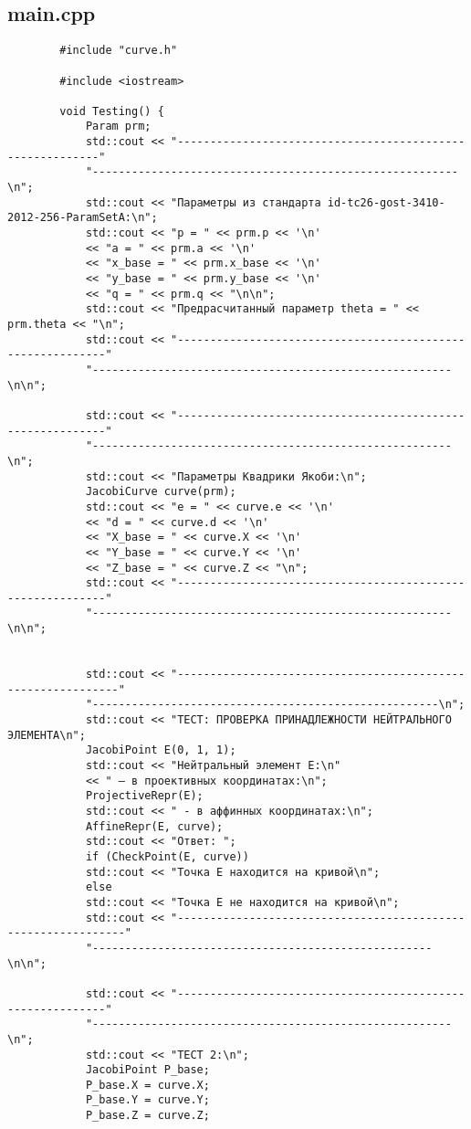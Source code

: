 \documentclass[a4paper,12pt]{article}
\begin{document}
	\subsection{main.cpp}
	\begin{verbatim}
		#include "curve.h"
		
		#include <iostream>
		
		void Testing() {
			Param prm;
			std::cout << "----------------------------------------------------------"
			"--------------------------------------------------------\n";
			std::cout << "Параметры из стандарта id-tc26-gost-3410-2012-256-ParamSetA:\n";
			std::cout << "p = " << prm.p << '\n'
			<< "a = " << prm.a << '\n'
			<< "x_base = " << prm.x_base << '\n'
			<< "y_base = " << prm.y_base << '\n'
			<< "q = " << prm.q << "\n\n";
			std::cout << "Предрасчитанный параметр theta = " << prm.theta << "\n";
			std::cout << "-----------------------------------------------------------"
			"-------------------------------------------------------\n\n";
			
			std::cout << "-----------------------------------------------------------"
			"-------------------------------------------------------\n";
			std::cout << "Параметры Квадрики Якоби:\n";
			JacobiCurve curve(prm);
			std::cout << "e = " << curve.e << '\n'
			<< "d = " << curve.d << '\n'
			<< "X_base = " << curve.X << '\n'
			<< "Y_base = " << curve.Y << '\n'
			<< "Z_base = " << curve.Z << "\n";
			std::cout << "-----------------------------------------------------------"
			"-------------------------------------------------------\n\n";
			
			
			std::cout << "-------------------------------------------------------------"
			"-----------------------------------------------------\n";
			std::cout << "ТЕСТ: ПРОВЕРКА ПРИНАДЛЕЖНОСТИ НЕЙТРАЛЬНОГО ЭЛЕМЕНТА\n";
			JacobiPoint E(0, 1, 1);
			std::cout << "Нейтральный элемент Е:\n"
			<< " – в проективных координатах:\n";
			ProjectiveRepr(E);
			std::cout << " - в аффинных координатах:\n";
			AffineRepr(E, curve);
			std::cout << "Ответ: ";
			if (CheckPoint(E, curve))
			std::cout << "Точка E находится на кривой\n";
			else
			std::cout << "Точка E не находится на кривой\n";
			std::cout << "--------------------------------------------------------------"
			"----------------------------------------------------\n\n";
			
			std::cout << "-----------------------------------------------------------"
			"-------------------------------------------------------\n";
			std::cout << "ТЕСТ 2:\n";
			JacobiPoint P_base;
			P_base.X = curve.X;
			P_base.Y = curve.Y;
			P_base.Z = curve.Z;
			

\end{verbatim}
\end{document}
